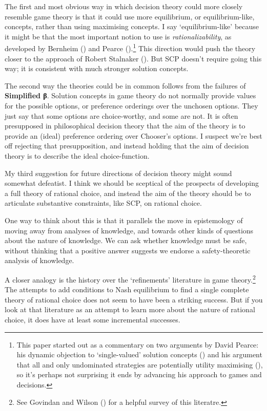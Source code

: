 \documentclass[
  10pt,
  letterpaper,
  DIV=11,
  numbers=noendperiod,
  twoside]{scrartcl}
\begin{document}
The first and most obvious way in which decision theory could more
closely resemble game theory is that it could use more equilibrium, or
equilibrium-like, concepts, rather than using maximising concepts. I say
`equilibrium-like' because it might be that the most important notion to
use is \emph{rationalizability}, as developed by Bernheim
() and Pearce
().\footnote{This paper started out as a
  commentary on two arguments by David Pearce: his dynamic objection to
  `single-valued' solution concepts ()
  and his argument that all and only undominated strategies are
  potentially utility maximising (), so
  it's perhaps not surprising it ends by advancing his approach to games
  and decisions.} This direction would push the theory closer to the
approach of Robert Stalnaker (). But
SCP doesn't require going this way; it is consistent with much stronger
solution concepts.

The second way the theories could be in common follows from the failures
of \textbf{Simplified β}. Solution concepts in game theory do not
normally provide values for the possible options, or preference
orderings over the unchosen options. They just say that some options are
choice-worthy, and some are not. It is often presupposed in
philosophical decision theory that the aim of the theory is to provide
an (ideal) preference ordering over Chooser's options. I suspect we're
best off rejecting that presupposition, and instead holding that the aim
of decision theory is to describe the ideal choice-function.

My third suggestion for future directions of decision theory might sound
somewhat defeatist. I think we should be sceptical of the prospects of
developing a full theory of rational choice, and instead the aim of the
theory should be to articulate substantive constraints, like SCP, on
rational choice.

One way to think about this is that it parallels the move in
epistemology of moving away from analyses of knowledge, and towards
other kinds of questions about the nature of knowledge. We can ask
whether knowledge must be safe, without thinking that a positive answer
suggests we endorse a safety-theoretic analysis of knowledge.

A closer analogy is the history over the `refinements' literature in
game theory.\footnote{See Govindan and Wilson
  () for a helpful survey of this
  literatre.} The attempts to add conditions to Nash equilibrium to find
a single complete theory of rational choice does not seem to have been a
striking success. But if you look at that literature as an attempt to
learn more about the nature of rational choice, it does have at least
some incremental successes.
\end{document}
